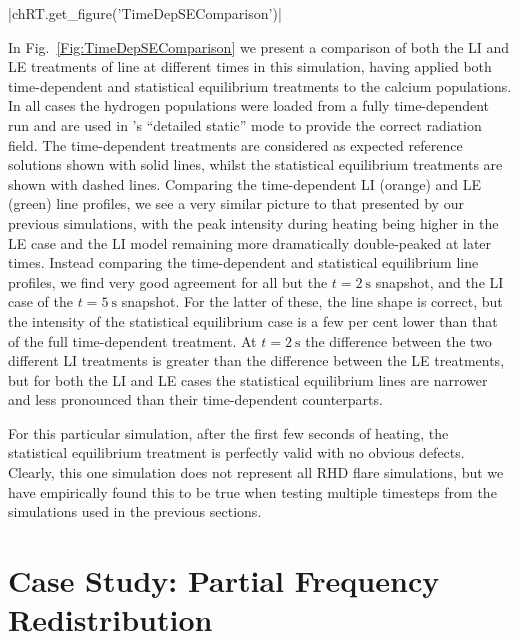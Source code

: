 \py[TimeDepRT]|chRT.get_figure('TimeDepSEComparison')|

In Fig.~\ref{Fig:TimeDepSEComparison} we present a comparison of both the LI and LE treatments of \CaLine{} line at different times in this simulation, having applied both time-dependent and statistical equilibrium treatments to the calcium populations.
In all cases the hydrogen populations were loaded from a fully time-dependent run and are used in \Lw{}'s ``detailed static'' mode to provide the correct radiation field.
The time-dependent treatments are considered as expected reference solutions shown with solid lines, whilst the statistical equilibrium treatments are shown with dashed lines.
Comparing the time-dependent LI (orange) and LE (green) line profiles, we see a very similar picture to that presented by our previous simulations, with the peak intensity during heating being higher in the LE case and the LI model remaining more dramatically double-peaked at later times.
Instead comparing the time-dependent and statistical equilibrium line profiles, we find very good agreement for all but the $t=\SI{2}{\second}$ snapshot, and the LI case of the $t=\SI{5}{\second}$ snapshot.
For the latter of these, the line shape is correct, but the intensity of the statistical equilibrium case is a few per cent lower than that of the full time-dependent treatment.
At $t=\SI{2}{\second}$ the difference between the two different LI treatments is greater than the difference between the LE treatments, but for both the LI and LE cases the statistical equilibrium lines are narrower and less pronounced than their time-dependent counterparts.

For this particular simulation, after the first few seconds of heating, the statistical equilibrium treatment is perfectly valid with no obvious defects.
Clearly, this one simulation does not represent all RHD flare simulations, but we have empirically found this to be true when testing multiple timesteps from the simulations used in the previous sections.


\section{Case Study: Partial Frequency Redistribution}\label{Sec:TimeDepPrd}

